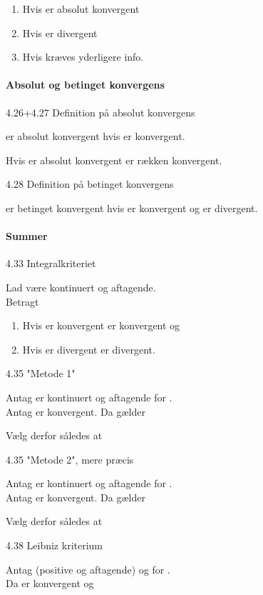 \documentclass[
]{article}
\providecommand{\tightlist}{%
  \setlength{\itemsep}{0pt}\setlength{\parskip}{0pt}}
\begin{document}
\begin{enumerate}
\tightlist
\item
  Hvis {} er {} absolut konvergent
\item
  Hvis {} er {} divergent
\item
  Hvis {} kræves yderligere info.
\end{enumerate}

\paragraph{Absolut og betinget
konvergens}\label{absolut-og-betinget-konvergens}

4.26+4.27 Definition på absolut konvergens

{} er absolut konvergent hvis {} er konvergent.

Hvis {} er absolut konvergent er rækken konvergent.

4.28 Definition på betinget konvergens

{} er betinget konvergent hvis {} er konvergent og {} er divergent.

\paragraph{Summer}\label{summer}

4.33 Integralkriteriet

Lad {} være kontinuert og aftagende.\\
Betragt {}

\begin{enumerate}
\item
  Hvis {} er konvergent er {} konvergent og
\item
  Hvis {} er divergent er {} divergent.
\end{enumerate}

4.35 {} "Metode 1"

Antag {} er kontinuert og aftagende for {}.\\
Antag {} er konvergent. Da gælder

Vælg derfor {} således at

4.35 {} "Metode 2", mere præcis

Antag {} er kontinuert og aftagende for {}.\\
Antag {} er konvergent. Da gælder

Vælg derfor {} således at

4.38 Leibniz\textquotesingle{} kriterium

Antag {} (positive og aftagende) og {} for {}.\\
Da er {} konvergent og
\end{document}
